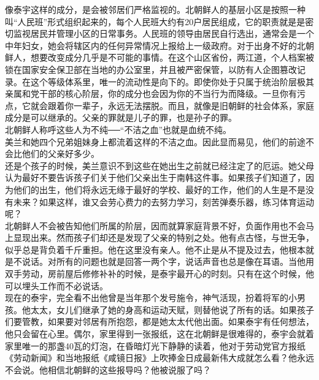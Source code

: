 \begin{multicols}{\theparacolNo}
像泰宇这样的成分，是会被邻居们严格监视的。北朝鲜人的基层小区是按照一种叫“人民班”形式组织起来的，每个人民班大约有20户居民组成，它的职责就是是密切监视居民并管理小区的日常事务。人民班的领导由居民自行选出，通常会是一个中年妇女，她会将辖区内的任何异常情况上报给上一级政府。对于出身不好的北朝鲜人，想要改变成分几乎是不可能的事情。在这个山区省份，两江道，个人档案被锁在国家安全保卫部在当地的办公室里，并且被严密保管，以防有人企图篡改记录。在这个等级体系里，唯一的流动性是向下的。即使你处于只属于统治阶层极其亲属和党干部的核心阶层，你的成分也会因为你的不当行为而降级。一旦你有污点，它就会跟着你一辈子，永远无法摆脱。而且，就像是旧朝鲜的社会体系，家庭成分是可以继承的。父亲的罪就是儿子的罪，也是孙子的罪。\\

北朝鲜人称呼这些人为不纯──“不洁之血”也就是血统不纯。\\

美兰和她四个兄弟姐妹身上都流着这样的不洁之血。因此显而易见，他们的前途不会比他们的父亲好多少。\\

还是个孩子的时候，美兰意识不到这些在她出生之前就已经注定了的厄运。她父母认为最好不要告诉孩子们关于他们父亲出生于南韩这件事。如果孩子们知道了，因为他们的出生，他们将永远无缘于最好的学校、最好的工作，他们的人生是不是没有未来？如果这样，谁又会劳心费力的去努力学习，刻苦弹奏乐器，练习体育运动呢？\\

北朝鲜人不会被告知他们所属的阶层，因而就算家庭背景不好，负面作用也不会马上显现出来。然而孩子们却还是发现了父亲的特别之处。他有点古怪，与世无争，似乎总是背负着千斤重担。他在这里没有亲人。他不止是从不提及过去，他根本就是不说话。对所有的问题也就是回答一两个字，说话声音也总是像在耳语。当他用双手劳动，房前屋后修修补补的时候，是泰宇最开心的时刻。只有在这个时候，他可以埋头工作而不必说话。\\

现在的泰宇，完全看不出他曾是当年那个发号施令，神气活现，扮着将军的小男孩。他太太，女儿们继承了她的身高和运动天赋，则替他说了所有的话。如果孩子们要管教，如果要对邻居有所抱怨，都是她太太代他出面。如果泰宇有任何想法，他只会留在心里。偶尔，家里得到一张报纸，这在北朝鲜是很难得的，泰宇会就着家里唯一的那盏40瓦的灯泡，在昏暗灯光下静静的读着，他对于劳动党官方报纸《劳动新闻》和当地报纸《咸镜日报》上吹捧金日成最新伟大成就怎么看？他永远不会说。他相信北朝鲜的这些报导吗？他被说服了吗？\\


\end{multicols}
